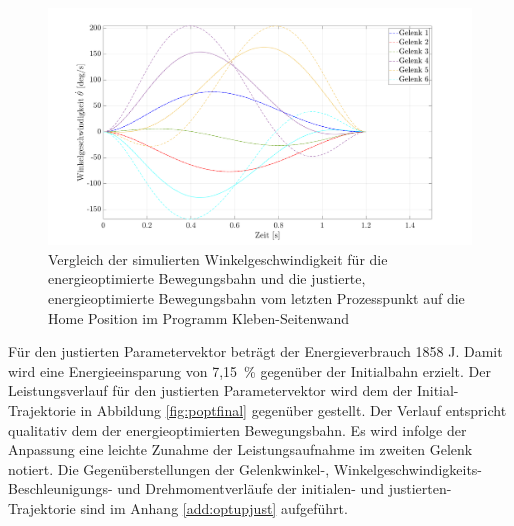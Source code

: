 \begin{figure}[tbph]
	\centering
	\includegraphics[width=1\linewidth]{images/Optimierungsergebnisse_up/veloptedit}
	\caption{Vergleich der simulierten Winkelgeschwindigkeit für die energieoptimierte Bewegungsbahn und die justierte, energieoptimierte Bewegungsbahn vom letzten Prozesspunkt auf die  Home Position im Programm Kleben-Seitenwand}
	\label{fig:veloptedit}
\end{figure}

%
Für den justierten Parametervektor beträgt der Energieverbrauch 1858 J. Damit wird eine Energieeinsparung von 7,15~\% gegenüber der Initialbahn erzielt. Der Leistungsverlauf für den justierten Parametervektor wird dem der Initial-Trajektorie in Abbildung \ref{fig:poptfinal} gegenüber gestellt. Der Verlauf entspricht qualitativ dem der  energieoptimierten Bewegungsbahn. Es wird infolge der Anpassung eine leichte Zunahme der Leistungsaufnahme im zweiten Gelenk notiert. Die Gegenüberstellungen der Gelenkwinkel-, Winkelgeschwindigkeits- Beschleunigungs- und Drehmomentverläufe der  initialen- und justierten-Trajektorie sind im Anhang \ref{add:optupjust} aufgeführt.

